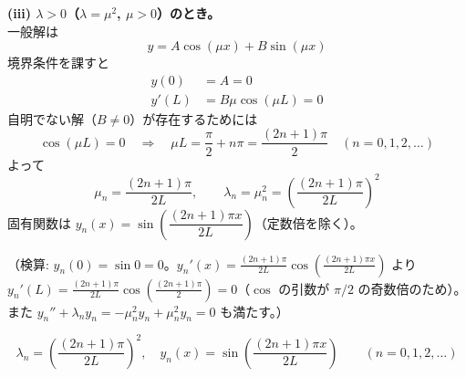 \documentclass[a4paper,11pt]{article}
\begin{document}
\textbf{(iii) $\lambda > 0$（$\lambda = \mu^{2}$, $\mu>0$）のとき。}\\
一般解は
\[
y = A\cos(\mu x) + B\sin(\mu x)
\]
境界条件を課すと
\begin{align*}
y(0) &= A = 0 \\
y'(L) &= B\mu\cos(\mu L) = 0
\end{align*}
自明でない解（$B \neq 0$）が存在するためには
\[
\cos(\mu L) = 0 \quad\Longrightarrow\quad \mu L = \frac{\pi}{2} + n\pi = \frac{(2n+1)\pi}{2} \quad (n = 0, 1, 2, \dots)
\]
よって
\[
\mu_{n} = \frac{(2n+1)\pi}{2L}, \qquad \lambda_{n} = \mu_{n}^{2} = \left(\frac{(2n+1)\pi}{2L}\right)^{2}
\]
固有関数は $y_{n}(x) = \sin\!\left(\dfrac{(2n+1)\pi x}{2L}\right)$（定数倍を除く）。

（検算: $y_n(0) = \sin 0 = 0$。$y_n'(x) = \frac{(2n+1)\pi}{2L}\cos\left(\frac{(2n+1)\pi x}{2L}\right)$ より $y_n'(L) = \frac{(2n+1)\pi}{2L}\cos\left(\frac{(2n+1)\pi}{2}\right) = 0$（$\cos$ の引数が $\pi/2$ の奇数倍のため）。また $y_n'' + \lambda_n y_n = -\mu_n^2 y_n + \mu_n^2 y_n = 0$ も満たす。）

\[
\boxed{\; \lambda_{n} = \left(\frac{(2n+1)\pi}{2L}\right)^{2}, \quad y_{n}(x) = \sin\!\left(\frac{(2n+1)\pi x}{2L}\right) \qquad (n = 0, 1, 2, \dots) \;}
\]
\end{document}
